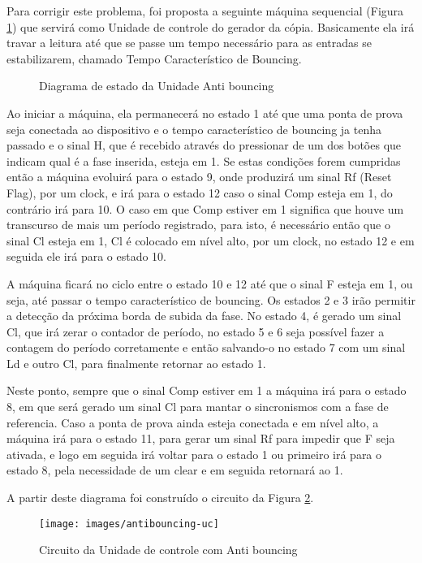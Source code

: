\documentclass[12pt,a4paper,openany]{abntex2}
\begin{document}
Para corrigir este problema, foi proposta a seguinte máquina sequencial (Figura \ref{fig:antibouncing-diagrama}) que servirá como Unidade de controle do gerador da cópia. Basicamente ela irá travar a leitura até que se passe um tempo necessário para as entradas se estabilizarem, chamado Tempo Característico de Bouncing.

\begin{figure}[!htp]
	\centering
	\caption{Diagrama de estado da Unidade Anti bouncing}
	\label{fig:antibouncing-diagrama}
\end{figure}

Ao iniciar a máquina, ela permanecerá no estado 1 até que uma ponta de prova seja conectada ao dispositivo e o tempo característico de bouncing ja tenha passado e o sinal H, que é recebido através do pressionar de um dos botões que indicam qual é a fase inserida, esteja em 1. Se estas condições forem cumpridas então a máquina evoluirá para o estado 9, onde produzirá um sinal Rf (Reset Flag), por um clock, e irá para o estado 12 caso o sinal Comp esteja em 1, do contrário irá para 10. O caso em que Comp estiver em 1 significa que houve um transcurso de mais um período registrado, para isto, é necessário então que o sinal Cl esteja em 1, Cl é colocado em nível alto, por um clock, no estado 12 e em seguida ele irá para o estado 10.

A máquina ficará no ciclo entre o estado 10 e 12 até que o sinal F esteja em 1, ou seja, até passar o tempo característico de bouncing. Os estados 2 e 3 irão permitir a detecção da próxima borda de subida da fase. No estado 4, é gerado um sinal Cl, que irá zerar o contador de período, no estado 5 e 6 seja possível fazer a contagem do período corretamente e então salvando-o no estado 7 com um sinal Ld e outro Cl, para finalmente retornar ao estado 1.

Neste ponto, sempre que o sinal Comp estiver em 1 a máquina irá para o estado 8, em que será gerado um sinal Cl para mantar o sincronismos com a fase de referencia. Caso a ponta de prova ainda esteja conectada e em nível alto, a máquina irá para o estado 11, para gerar um sinal Rf para impedir que F seja ativada, e logo em seguida irá voltar para o estado 1 ou primeiro irá para o estado 8, pela necessidade de um clear e em seguida retornará ao 1.

A partir deste diagrama foi construído o circuito da Figura \ref{fig:antibouncing-uc}.

\begin{figure}[!htp]
	\centering
	\caption{Circuito da Unidade de controle com Anti bouncing}
	\texttt{[image: images/antibouncing-uc]}	\label{fig:antibouncing-uc}
\end{figure}
\end{document}
